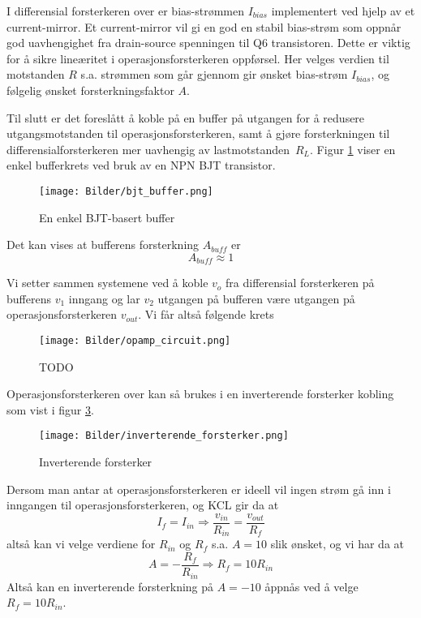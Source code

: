 I differensial forsterkeren over er bias-strømmen $I_{bias}$ implementert ved hjelp av
et current-mirror. Et current-mirror vil gi en god en stabil bias-strøm som oppnår god 
uavhengighet fra drain-source spenningen til Q6 transistoren. Dette er viktig for å sikre 
lineæritet i operasjonsforsterkeren oppførsel. Her velges verdien til motstanden 
$R$ s.a. strømmen som går gjennom gir ønsket bias-strøm $I_{bias}$, og følgelig ønsket 
forsterkningsfaktor $A$.


Til slutt er det foreslått å koble på en buffer på utgangen for å redusere utgangsmotstanden 
til operasjonsforsterkeren, samt å gjøre forsterkningen til differensialforsterkeren mer uavhengig av 
lastmotstanden $R_L$. Figur \ref{fig:bjt_buffer} viser en enkel bufferkrets ved bruk av en NPN BJT transistor.

\begin{figure}[H]
    \centering
    \texttt{[image: Bilder/bjt\_buffer.png]}
    \caption{En enkel BJT-basert buffer \cite{bjt_buffer}}
    \label{fig:bjt_buffer}
\end{figure}

Det kan vises \cite{bjt_buffer} at bufferens forsterkning $A_{buff}$ er
\[
    A_{buff} \approx 1
\]

Vi setter sammen systemene ved å koble $v_o$ fra differensial forsterkeren på bufferens $v_1$ inngang og 
lar $v_2$ utgangen på bufferen være utgangen på operasjonsforsterkeren $v_{out}$.
Vi får altså følgende krets

\begin{figure}[H]
    \centering
    \texttt{[image: Bilder/opamp\_circuit.png]}
    \caption{TODO}
    \label{fig:opamp_circuit.png}
\end{figure}

Operasjonsforsterkeren over kan så brukes i en inverterende forsterker kobling som vist i 
figur \ref{fig:invertering_forsterker}.
\begin{figure}[H]
    \centering
    \texttt{[image: Bilder/inverterende\_forsterker.png]}
    \caption{Inverterende forsterker \cite{invert_forsterker_img}}
    \label{fig:invertering_forsterker}
\end{figure}

Dersom man antar at operasjonsforsterkeren er ideell vil ingen strøm gå inn i inngangen til operasjonsforsterkeren,
og KCL gir da at 
\[
    I_{f} = I_{in} \Rightarrow \frac{v_{in}}{R_{in}} = \frac{v_{out}}{R_{f}}
\]
altså kan vi velge verdiene for $R_{in}$ og $R_f$ s.a. $A = 10$ slik ønsket, og vi har da at 
\[
    A = -\frac{R_f}{R_{in}} \Rightarrow R_f = 10R_{in}
\]
Altså kan en inverterende forsterkning på $A = -10$ åppnås ved å velge $R_f = 10R_{in}$.
